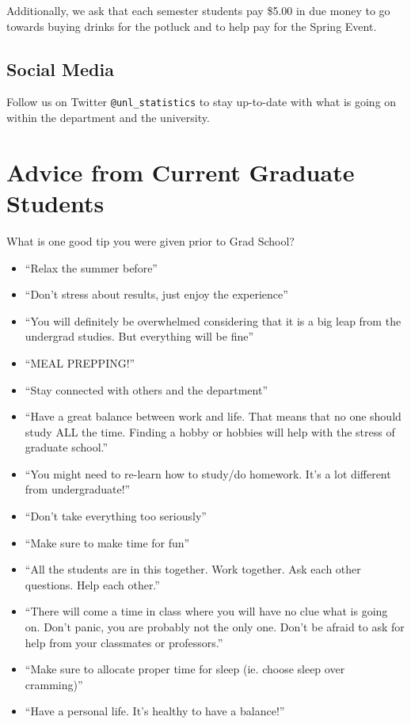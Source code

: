 \documentclass[
  12pt,
]{book}
\providecommand{\tightlist}{%
  \setlength{\itemsep}{0pt}\setlength{\parskip}{0pt}}
\begin{document}
Additionally, we ask that each semester students pay \$5.00 in due money to go towards buying drinks for the potluck and to help pay for the Spring Event.

\hypertarget{social-media}{%
\section{Social Media}\label{social-media}}

Follow us on Twitter \texttt{@unl\_statistics} to stay up-to-date with what is going on within the department and the university.

\hypertarget{advice}{%
\chapter{Advice from Current Graduate Students}\label{advice}}

What is one good tip you were given prior to Grad School?

\begin{itemize}
\tightlist
\item
  ``Relax the summer before''
\item
  ``Don't stress about results, just enjoy the experience''
\item
  ``You will definitely be overwhelmed considering that it is a big leap from the undergrad studies. But everything will be fine''
\item
  ``MEAL PREPPING!''
\item
  ``Stay connected with others and the department''
\item
  ``Have a great balance between work and life. That means that no one should study ALL the time. Finding a hobby or hobbies will help with the stress of graduate school.''
\item
  ``You might need to re-learn how to study/do homework. It's a lot different from undergraduate!''
\item
  ``Don't take everything too seriously''
\item
  ``Make sure to make time for fun''
\item
  ``All the students are in this together. Work together. Ask each other questions. Help each other.''
\item
  ``There will come a time in class where you will have no clue what is going on. Don't panic, you are probably not the only one. Don't be afraid to ask for help from your classmates or professors.''
\item
  ``Make sure to allocate proper time for sleep (ie. choose sleep over cramming)''
\item
  ``Have a personal life. It's healthy to have a balance!''
\end{itemize}
\end{document}
